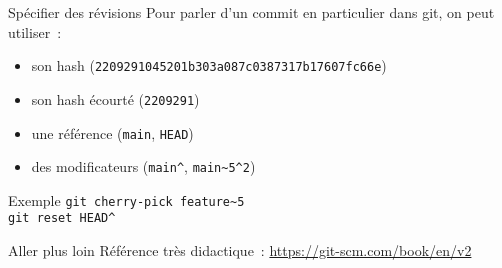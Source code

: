 \begin{frame}{Spécifier des révisions}
  Pour parler d'un commit en particulier dans git, on peut utiliser~:

  \begin{itemize}[<+->]
    \item son hash (\texttt{2209291045201b303a087c0387317b17607fc66e})
    \item son hash écourté (\texttt{2209291})
    \item une référence (\texttt{main}, \texttt{HEAD})
    \item des modificateurs (\texttt{main\^{}}, \texttt{main\~{}5\^{}2})
  \end{itemize}

  \begin{exampleblock}{Exemple}
    \texttt{git cherry-pick feature\~{}5}\\
    \texttt{git reset HEAD\^{}}
  \end{exampleblock}
\end{frame}

\begin{frame}{Aller plus loin}
  Référence très didactique~: \url{https://git-scm.com/book/en/v2}
\end{frame}